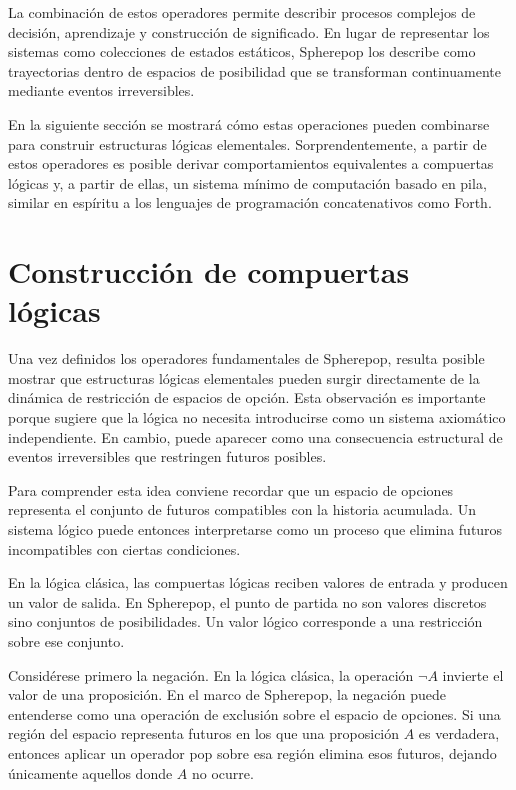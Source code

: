 \documentclass[12pt]{article}
\begin{document}
La combinación de estos operadores permite describir procesos complejos de decisión, aprendizaje y construcción de significado. En lugar de representar los sistemas como colecciones de estados estáticos, Spherepop los describe como trayectorias dentro de espacios de posibilidad que se transforman continuamente mediante eventos irreversibles.

En la siguiente sección se mostrará cómo estas operaciones pueden combinarse para construir estructuras lógicas elementales. Sorprendentemente, a partir de estos operadores es posible derivar comportamientos equivalentes a compuertas lógicas y, a partir de ellas, un sistema mínimo de computación basado en pila, similar en espíritu a los lenguajes de programación concatenativos como Forth.

\section{Construcción de compuertas lógicas}

Una vez definidos los operadores fundamentales de Spherepop, resulta posible mostrar que estructuras lógicas elementales pueden surgir directamente de la dinámica de restricción de espacios de opción. Esta observación es importante porque sugiere que la lógica no necesita introducirse como un sistema axiomático independiente. En cambio, puede aparecer como una consecuencia estructural de eventos irreversibles que restringen futuros posibles.

Para comprender esta idea conviene recordar que un espacio de opciones representa el conjunto de futuros compatibles con la historia acumulada. Un sistema lógico puede entonces interpretarse como un proceso que elimina futuros incompatibles con ciertas condiciones.

En la lógica clásica, las compuertas lógicas reciben valores de entrada y producen un valor de salida. En Spherepop, el punto de partida no son valores discretos sino conjuntos de posibilidades. Un valor lógico corresponde a una restricción sobre ese conjunto.

Considérese primero la negación. En la lógica clásica, la operación \(\neg A\) invierte el valor de una proposición. En el marco de Spherepop, la negación puede entenderse como una operación de exclusión sobre el espacio de opciones. Si una región del espacio representa futuros en los que una proposición \(A\) es verdadera, entonces aplicar un operador pop sobre esa región elimina esos futuros, dejando únicamente aquellos donde \(A\) no ocurre.
\end{document}
